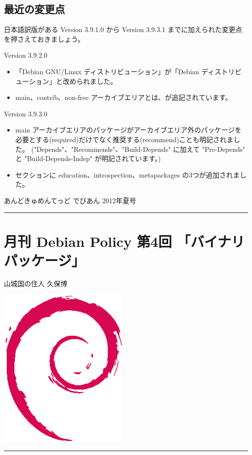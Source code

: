 \documentclass[mingoth,a4paper]{jsarticle}
\renewcommand{\dancersection}[2]{%
\newpage
あんどきゅめんてっど でびあん 2012年夏号
%
\vspace{0.1mm}\\
{\color{dancerdarkblue}\rule{\hsize}{2mm}}

%
%
\begin{minipage}[t]{0.6\hsize}
\color{dancerdarkblue}
\vspace{1cm}
\section{#1}
\hfill{}#2\\
\end{minipage}
\begin{minipage}[t]{0.4\hsize}
\vspace{-2cm}
\hfill{}\includegraphics[height=8cm]{image200502/openlogo-nd.eps}\\
\vspace{-5cm}
\end{minipage}
%
{\color{dancerlightblue}\rule{0.66\hsize}{2mm}}
%
\vspace{2cm}
}
\begin{document}
\subsection{最近の変更点}
日本語訳版がある Version 3.9.1.0 から Version 3.9.3.1 までに加えられた変更点を押さえておきましょう。

Version 3.9.2.0
\begin{itemize}
\item 「Debian GNU/Linux ディストリビューション」が「Debian ディストリビューション」と改められました。
\item main、contrib、non-free アーカイブエリアとは、が追記されています。
\end{itemize}

Version 3.9.3.0
\begin{itemize}
\item main アーカイブエリアのパッケージがアーカイブエリア外のパッケージを必要とする(required)だけでなく推奨する(recommend)ことも明記されました。
  ("Depends"、"Recommends"、"Build-Depends" に加えて "Pre-Depends" と "Build-Depends-Indep" が明記されています。)
\item セクションに education、introspection、metapackages の3つが追加されました。
\end{itemize}


\dancersection{月刊 Debian Policy 第4回 「バイナリパッケージ」}{山城国の住人 久保博}
\end{document}
